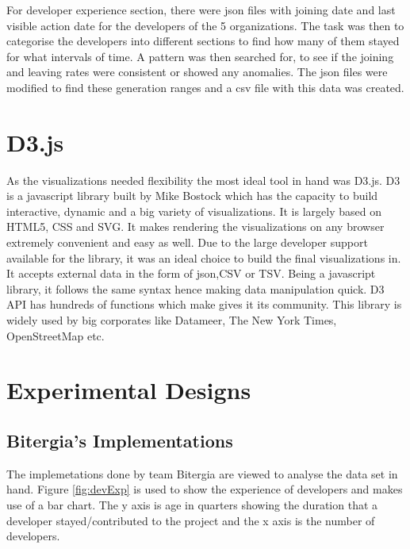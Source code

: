 \documentclass[seploa]{beavtex}
\begin{document}
For developer experience section, there were json files with joining date and last visible action date for the developers of the 5 organizations. The task was then to categorise the developers into different sections to find how many of them stayed for what intervals of time. A pattern was then searched for, to see if the joining and leaving rates were consistent or showed any anomalies. The json files were modified to find these generation ranges and a csv file with this data was created.

\section{D3.js}
As the visualizations needed flexibility the most ideal tool in hand was D3.js. D3 is a javascript library built by Mike Bostock which has the capacity to build interactive, dynamic and a big variety of visualizations. It is largely based on HTML5, CSS and SVG. It makes rendering the visualizations on any browser extremely convenient and easy as well. Due to the large developer support available for the library, it was an ideal choice to build the final visualizations in. It accepts external data in the form of json,CSV or TSV. Being a javascript library, it follows the same syntax hence making data manipulation quick. D3 API has hundreds of functions which make gives it its community. This library is widely used by big corporates like Datameer, The New York Times, OpenStreetMap etc.

\section{Experimental Designs}

\subsection{Bitergia's Implementations}
The implemetations done by team Bitergia are viewed to analyse the data set in hand. Figure \ref{fig:devExp} is used to show the experience of developers and makes use of a bar chart. The y axis is age in quarters showing the duration that a developer stayed/contributed to the project and the x axis is the number of developers.
\end{document}
